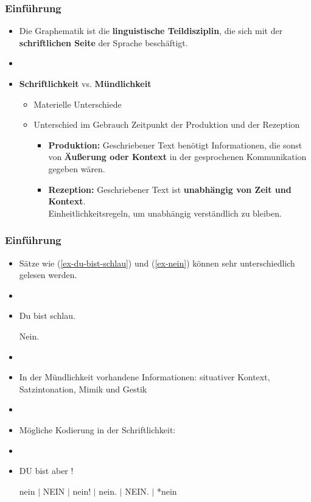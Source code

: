 \begin{frame}
\frametitle{Einführung}

\begin{itemize}
	\item Die Graphematik ist die \textbf{linguistische Teildisziplin}, die sich mit der \textbf{schriftlichen Seite} der Sprache beschäftigt. 
	\item[]
	\item \textbf{Schriftlichkeit} vs. \textbf{Mündlichkeit}
	
	\begin{itemize}
		\item Materielle Unterschiede
		\item Unterschied im Gebrauch \ras Zeitpunkt der Produktion und der Rezeption
		
		\begin{itemize}
			\item  \textbf{Produktion:} Geschriebener Text benötigt Informationen, die sonst von \textbf{Äußerung oder Kontext} in der gesprochenen Kommunikation gegeben wären.
			\item \textbf{Rezeption:} Geschriebener Text ist \textbf{unabhängig von Zeit und Kontext}.\\
			\ras Einheitlichkeitsregeln, um unabhängig verständlich zu bleiben.
		\end{itemize}

	\end{itemize} 

\end{itemize}

\end{frame}


\begin{frame}
\frametitle{Einführung}

\begin{itemize}
	\item Sätze wie (\ref{ex-du-bist-schlau}) und (\ref{ex-nein}) können sehr unterschiedlich gelesen werden.
	\item[]
	\item[]
		
	  \ea\label{ex-du-bist-schlau}
          Du bist schlau.
          \z

	  \ea\label{ex-nein}
          Nein.
          \z
\pause		
	\item[]
	\item In der Mündlichkeit vorhandene Informationen: situativer Kontext, Satzintonation, Mimik und Gestik
	\item[]
	\item Mögliche Kodierung in der Schriftlichkeit:
	\item[]
	\item[]
		
	  \ea
          DU bist aber !
          \z
	  
	  \ea
          nein $|$ NEIN $|$ nein! $|$ nein. $|$ NEIN. $|$ *nein
          \z

\end{itemize}		

\end{frame}



